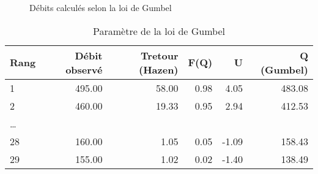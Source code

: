 \begin{figure}[H]
    \centering
    \caption{Débits calculés selon la loi de Gumbel}
    \label{graph:debits_gumbel}
\end{figure}

\begin{table}[H]
    \centering
    \begin{tabular}{l|r|r|r|r|r}
        \toprule
        \textbf{Rang} & \textbf{Débit observé} & \textbf{Tretour (Hazen)} & \textbf{F(Q)} & \textbf{U} & \textbf{Q (Gumbel)} \\
        \midrule
        1             & 495.00                 & 58.00                    & 0.98          & 4.05       & 483.08              \\
        2             & 460.00                 & 19.33                    & 0.95          & 2.94       & 412.53              \\
        \dots         &                        &                          &               &            &                     \\
        28            & 160.00                 & 1.05                     & 0.05          & -1.09      & 158.43              \\
        29            & 155.00                 & 1.02                     & 0.02          & -1.40      & 138.49              \\
        \bottomrule
    \end{tabular}
    \caption{Paramètre de la loi de Gumbel}
    \label{tab:gumbelcalcul}
\end{table}